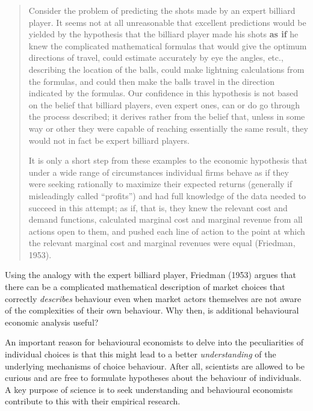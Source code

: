 \documentclass[
]{book}
\begin{document}
\begin{quote}
Consider the problem of predicting the shots made by an expert billiard player. It seems not at all unreasonable that excellent predictions would be yielded by the hypothesis that the billiard player made his shots \textbf{as if} he knew the complicated mathematical formulas that would give the optimum directions of travel, could estimate accurately by eye the angles, etc., describing the location of the balls, could make lightning calculations from the formulas, and could then make the balls travel in the direction indicated by the formulas. Our confidence in this hypothesis is not based on the belief that billiard players, even expert ones, can or do go through the process described; it derives rather from the belief that, unless in some way or other they were capable of reaching essentially the same result, they would not in fact be expert billiard players.

It is only a short step from these examples to the economic hypothesis that under a wide range of circumstances individual firms behave as if they were seeking rationally to maximize their expected returns (generally if misleadingly called ``profits'') and had full knowledge of the data needed to succeed in this attempt; as if, that is, they knew the relevant cost and demand functions, calculated marginal cost and marginal revenue from all actions open to them, and pushed each line of action to the point at which the relevant marginal cost and marginal revenues were equal (Friedman, 1953).
\end{quote}

Using the analogy with the expert billiard player, Friedman (1953) argues that there can be a complicated mathematical description of market choices that correctly \emph{describes} behaviour even when market actors themselves are not aware of the complexities of their own behaviour. Why then, is additional behavioural economic analysis useful?

An important reason for behavioural economists to delve into the peculiarities of individual choices is that this might lead to a better \emph{understanding} of the underlying mechanisms of choice behaviour. After all, scientists are allowed to be curious and are free to formulate hypotheses about the behaviour of individuals. A key purpose of science is to seek understanding and behavioural economists contribute to this with their empirical research.
\end{document}
